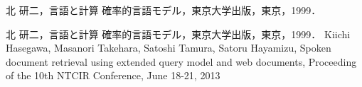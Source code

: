 \documentclass[a4paper,twocolumn,report,10.5pt]{jsbook}
\begin{document}
\begin{thebibliography}{99}

北 研二，言語と計算 確率的言語モデル，東京大学出版，東京，1999．

北 研二，言語と計算 確率的言語モデル，東京大学出版，東京，1999．
Kiichi Hasegawa, Masanori Takehara, Satoshi Tamura, Satoru Hayamizu, Spoken document retrieval using extended query model and web documents, Proceeding of the 10th NTCIR Conference, June 18-21, 2013



















\end{thebibliography}
\end{document}
